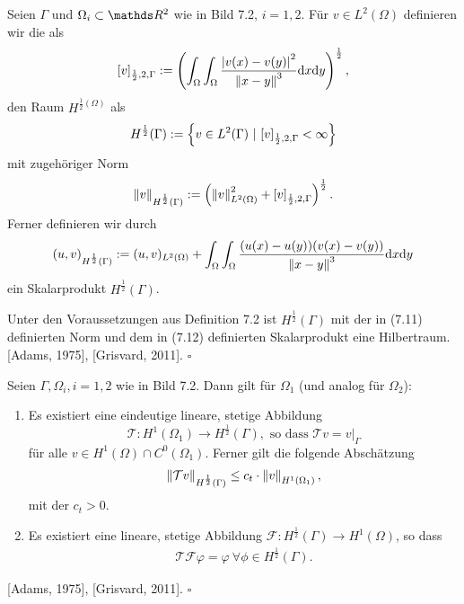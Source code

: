 Seien $\Gamma$ und $\Omega_i\subset \R^2$ wie in Bild 7.2, $i=1,2$.
Für $v\in L^2(\Omega)$ definieren wir die  als 
\[
[v]_{\frac{1}{2},2,\Gamma} := \left( \int_\Omega \int_\Omega \frac{\left\vert v(x)-v(y)\right\vert^2}{\left\Vert x-y\right\Vert^3}\mathrm{d} x\mathrm{d} y\right)^{\frac{1}{2}},
\]
den Raum $H^{\frac{1}{2}(\Omega)}$ als
\begin{align}
H^{\frac{1}{2}}(\Gamma) := \left\{v\in L^2(\Gamma)~|~ [v]_{\frac{1}{2},2,\Gamma} < \infty\right\}
\end{align}
mit zugehöriger Norm
\begin{align}
\left\Vert v\right\Vert_{H^{\frac{1}{2}}(\Gamma)} := \left( \left\Vert v\right\Vert_{L^2(\Omega)}^2 + [v]_{\frac{1}{2},2,\Gamma}\right)^{\frac{1}{2}}.
\end{align}
Ferner definieren wir durch
\begin{align}
(u,v)_{H^{\frac{1}{2}}(\Gamma)} := (u,v)_{L^2(\Omega)} + \int_\Omega \int_\Omega \frac{(u(x)-u(y))(v(x)-v(y))}{\left\Vert x-y\right\Vert^3}\mathrm{d} x\mathrm{d} y
\end{align}
ein Skalarprodukt $H^{\frac{1}{2}}(\Gamma)$.

Unter den Voraussetzungen aus Definition 7.2 ist $H^{\frac{1}{2}}(\Gamma)$ mit der in (7.11) definierten Norm und dem in (7.12) definierten Skalarprodukt eine Hilbertraum.\\

 [Adams, 1975], [Grisvard, 2011].
\hfill $\square$

Seien $\Gamma, \Omega_i,i=1,2$ wie in Bild 7.2.
Dann gilt für $\Omega_1$ (und analog für $\Omega_2$):
\begin{enumerate}[(1)]
	\item Es existiert eine eindeutige lineare, stetige Abbildung
	\[
	\mathcal{T}: H^1(\Omega_1) \to H^{\frac{1}{2}}(\Gamma), \text{ so dass } \mathcal{T}v=v|_\Gamma
	\]
	für alle $v\in H^1(\Omega)\cap C^0(\Omega_1)$.
	Ferner gilt die folgende Abschätzung
	\begin{align}
	\left\Vert\mathcal{T}v\right\Vert_{H^{\frac{1}{2}}(\Gamma)} \le c_t\cdot \left\Vert v\right\Vert_{H^1(\Omega_1)},
	\end{align}
	mit der  $c_t>0$.
	\item Es existiert eine lineare, stetige Abbildung $\mathcal{F}: H^{\frac{1}{2}}(\Gamma)\to H^1(\Omega)$, so dass
	\begin{align}
	\mathcal{T}\mathcal{F}\varphi = \varphi ~ \forall \phi\in H^{\frac{1}{2}}(\Gamma).
	\end{align}
\end{enumerate}

 [Adams, 1975], [Grisvard, 2011].
\hfill $\square$
















\cleardoubleoddemptypage

 